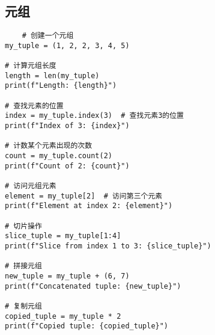         \subsection{元组}\label{subsec:4}
            \begin{verbatim}
    # 创建一个元组
my_tuple = (1, 2, 2, 3, 4, 5)

# 计算元组长度
length = len(my_tuple)
print(f"Length: {length}")

# 查找元素的位置
index = my_tuple.index(3)  # 查找元素3的位置
print(f"Index of 3: {index}")

# 计数某个元素出现的次数
count = my_tuple.count(2)
print(f"Count of 2: {count}")

# 访问元组元素
element = my_tuple[2]  # 访问第三个元素
print(f"Element at index 2: {element}")

# 切片操作
slice_tuple = my_tuple[1:4]
print(f"Slice from index 1 to 3: {slice_tuple}")

# 拼接元组
new_tuple = my_tuple + (6, 7)
print(f"Concatenated tuple: {new_tuple}")

# 复制元组
copied_tuple = my_tuple * 2
print(f"Copied tuple: {copied_tuple}")
            \end{verbatim}